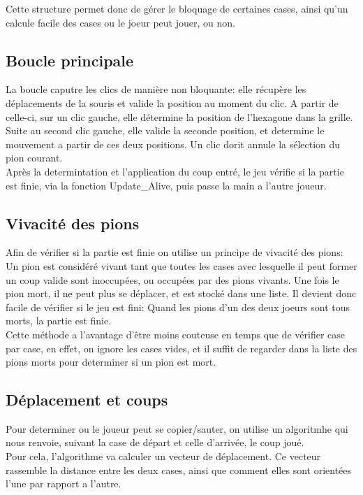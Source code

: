 \documentclass{report}
\begin{document}
		Cette structure permet donc de gérer le bloquage de certaines cases, ainsi qu'un calcule facile des cases ou le joeur peut jouer, ou non. 

	\subsection {Boucle principale}
		
	La boucle caputre les clics de manière non bloquante: elle récupère les déplacements de la souris et valide la position au moment du clic. A partir de celle-ci, sur un clic gauche, elle détermine la position de l'hexagone dans la grille. Suite au second clic gauche, elle valide la seconde position, et determine le mouvement a partir de ces deux positions. Un clic dorit annule la sélection du pion courant.\\

Après la determintation et l'application du coup entré, le jeu vérifie si la partie est finie, via la fonction Update\_Alive, puis passe la main a l'autre joueur. 
	\subsection{Vivacité des pions}

Afin de vérifier si la partie est finie on utilise un principe de vivacité des pions: Un pion est considéré vivant tant que toutes les cases avec lesquelle il peut former un coup valide sont inoccupées, ou occupées par des pions vivants. Une fois le pion mort, il ne peut plus se déplacer, et est stocké dans une liste. Il devient donc facile de vérifier si le jeu est fini: Quand les pions d'un des deux joeurs sont tous morts, la partie est finie.\\

Cette méthode a l'avantage d'être moins couteuse en temps que de vérifier case par case, en effet, on ignore les cases vides, et il suffit de regarder dans la liste des pions morts pour determiner si un pion est mort.



	\subsection{Déplacement et coups}
	Pour determiner ou le joueur peut se copier/sauter, on utilise un algoritmhe qui nous renvoie, suivant la case de départ et celle d'arrivée, le coup joué.\\
	
	Pour cela, l'algorithme va calculer un vecteur de déplacement. Ce vecteur rassemble la distance entre les deux cases, ainsi que comment elles sont orientées l'une par rapport a l'autre.\		\
	
\end{document}
